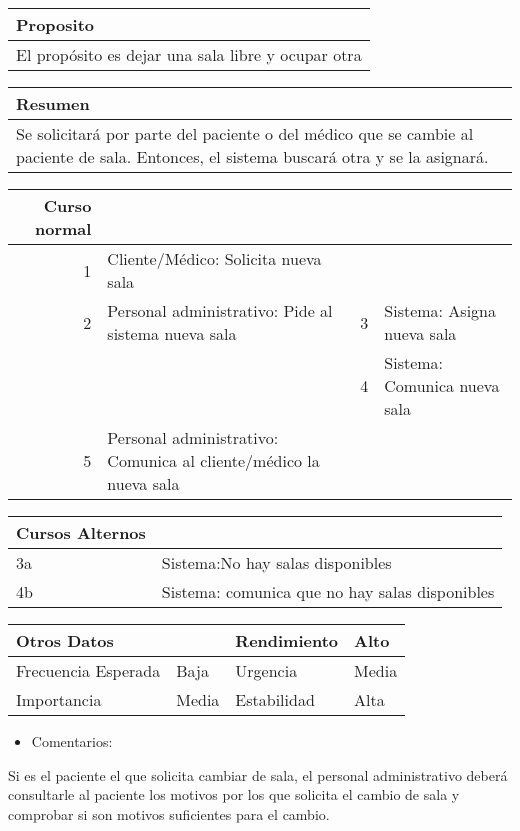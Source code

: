 \documentclass[11pt]{article}
\begin{document}
\begin{center}
\begin{tabular}{l}
\hline
Proposito\\
\hline
El propósito es dejar una sala libre y ocupar otra\\
\hline
\end{tabular}
\end{center}


\begin{center}
\begin{tabular}{l}
\hline
Resumen\\
\hline
Se solicitará por parte del paciente o del médico que se cambie al paciente de sala. Entonces, el sistema buscará otra y se la asignará.\\
\hline
\end{tabular}
\end{center}

\begin{center}
\begin{tabular}{rlrl}
\hline
Curso normal &  &  & \\
\hline
1 & Cliente/Médico: Solicita nueva sala &  & \\
\hline
2 & Personal administrativo: Pide al sistema nueva sala & 3 & Sistema: Asigna nueva sala\\
\hline
 &  & 4 & Sistema: Comunica nueva sala\\
\hline
5 & Personal administrativo: Comunica al cliente/médico la nueva sala &  & \\
\hline
\end{tabular}
\end{center}



\begin{center}
\begin{tabular}{ll}
\hline
Cursos Alternos & \\
\hline
3a & Sistema:No hay salas disponibles\\
\hline
4b & Sistema: comunica que no hay salas disponibles\\
\hline
\end{tabular}
\end{center}


\begin{center}
\begin{tabular}{llll}
\hline
Otros Datos &  & Rendimiento & Alto\\
\hline
Frecuencia Esperada & Baja & Urgencia & Media\\
\hline
Importancia & Media & Estabilidad & Alta\\
\hline
\end{tabular}
\end{center}


\begin{itemize}
\item Comentarios:
\end{itemize}
Si es el paciente el que solicita cambiar de sala, el personal administrativo deberá consultarle al paciente los motivos por los que solicita el cambio de sala y comprobar si son motivos suficientes para el cambio.
\end{document}
